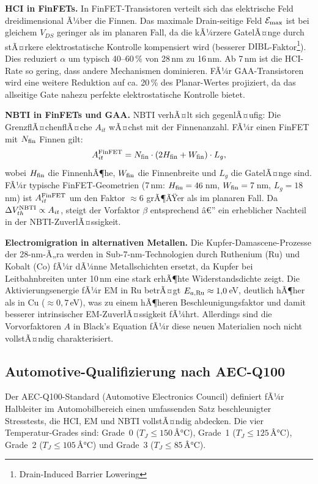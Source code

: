 ﻿\documentclass[a4paper,12pt]{article}
\theoremstyle{definition}
\begin{document}
\textbf{HCI in FinFETs.}
In FinFET-Transistoren verteilt sich das elektrische Feld dreidimensional Ã¼ber
die Finnen. Das maximale Drain-seitige Feld $\mathcal{E}_{\rm max}$ ist bei
gleichem $V_{DS}$ geringer als im planaren Fall, da die kÃ¼rzere GatelÃ¤nge durch
stÃ¤rkere elektrostatische Kontrolle kompensiert wird (besserer
$\mathrm{DIBL}$-Faktor\footnote{Drain-Induced Barrier Lowering}).
Dies reduziert $\alpha$ um typisch 40--60\,\% von 28\,nm zu 16\,nm.
Ab 7\,nm ist die HCI-Rate so gering, dass andere Mechanismen dominieren.
FÃ¼r GAA-Transistoren wird eine weitere Reduktion auf ca. 20\,\% des Planar-Wertes
projiziert, da das allseitige Gate nahezu perfekte elektrostatische Kontrolle bietet.

\textbf{NBTI in FinFETs und GAA.}
NBTI verhÃ¤lt sich gegenlÃ¤ufig: Die GrenzflÃ¤chenflÃ¤che $A_{it}$ wÃ¤chst mit der
Finnenanzahl. FÃ¼r einen FinFET mit $N_{\rm fin}$ Finnen gilt:
\[
A_{it}^{\rm FinFET} = N_{\rm fin} \cdot (2 H_{\rm fin} + W_{\rm fin}) \cdot L_g,
\]
wobei $H_{\rm fin}$ die FinnenhÃ¶he, $W_{\rm fin}$ die Finnenbreite und $L_g$ die
GatelÃ¤nge sind. FÃ¼r typische FinFET-Geometrien (7\,nm: $H_{\rm fin} = 46$\,nm,
$W_{\rm fin} = 7$\,nm, $L_g = 18$\,nm) ist $A_{it}^{\rm FinFET}$ um den Faktor
$\approx 6$ grÃ¶ÃŸer als im planaren Fall. Da $\Delta V_{th}^{\rm NBTI} \propto A_{it}$,
steigt der Vorfaktor $\beta$ entsprechend â€” ein erheblicher Nachteil in der
NBTI-ZuverlÃ¤ssigkeit.

\textbf{Electromigration in alternativen Metallen.}
Die Kupfer-Damascene-Prozesse der 28-nm-Ã„ra werden in Sub-7-nm-Technologien durch
Ruthenium (Ru) und Kobalt (Co) fÃ¼r dÃ¼nne Metallschichten ersetzt, da Kupfer
bei Leitbahnbreiten unter 10\,nm eine stark erhÃ¶hte Widerstandsdichte zeigt.
Die Aktivierungsenergie fÃ¼r EM in Ru betrÃ¤gt $E_{a,{\rm Ru}} \approx 1{,}0$\,eV,
deutlich hÃ¶her als in Cu ($\approx 0{,}7$\,eV), was zu einem hÃ¶heren
Beschleunigungsfaktor und damit besserer intrinsischer EM-ZuverlÃ¤ssigkeit fÃ¼hrt.
Allerdings sind die Vorvorfaktoren $A$ in Black's Equation fÃ¼r diese neuen
Materialien noch nicht vollstÃ¤ndig charakterisiert.

\subsection{Automotive-Qualifizierung nach AEC-Q100}
\label{sub:automotive}

Der AEC-Q100-Standard (Automotive Electronics Council) definiert fÃ¼r
Halbleiter im Automobilbereich einen umfassenden Satz beschleunigter Stresstests,
die HCI, EM und NBTI vollstÃ¤ndig abdecken. Die vier Temperatur-Grades sind:
Grade~0 ($T_J \leq 150$\,Â°C), Grade~1 ($T_J \leq 125$\,Â°C), Grade~2
($T_J \leq 105$\,Â°C) und Grade~3 ($T_J \leq 85$\,Â°C).
\end{document}
